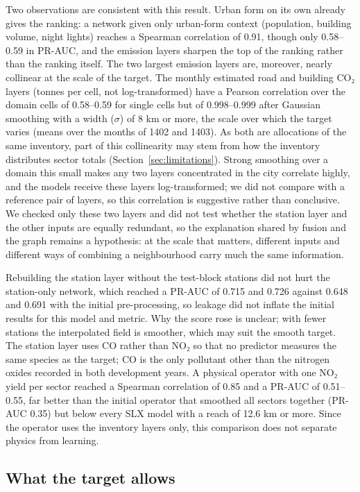 \documentclass[pdflatex,sn-basic]{sn-jnl}
\begin{document}
Two observations are consistent with this result. Urban form on its own already gives the ranking: a network given only urban-form context (population, building volume, night lights) reaches a Spearman correlation of 0.91, though only 0.58--0.59 in PR-AUC, and the emission layers sharpen the top of the ranking rather than the ranking itself. The two largest emission layers are, moreover, nearly collinear at the scale of the target. The monthly estimated road and building CO₂ layers (tonnes per cell, not log-transformed) have a Pearson correlation over the domain cells of 0.58--0.59 for single cells but of 0.998--0.999 after Gaussian smoothing with a width ($\sigma$) of 8 km or more, the scale over which the target varies (means over the months of 1402 and 1403). As both are allocations of the same inventory, part of this collinearity may stem from how the inventory distributes sector totals (Section~\ref{sec:limitations}). Strong smoothing over a domain this small makes any two layers concentrated in the city correlate highly, and the models receive these layers log-transformed; we did not compare with a reference pair of layers, so this correlation is suggestive rather than conclusive. We checked only these two layers and did not test whether the station layer and the other inputs are equally redundant, so the explanation shared by fusion and the graph remains a hypothesis: at the scale that matters, different inputs and different ways of combining a neighbourhood carry much the same information.

Rebuilding the station layer without the test-block stations did not hurt the station-only network, which reached a PR-AUC of 0.715 and 0.726 against 0.648 and 0.691 with the initial pre-processing, so leakage did not inflate the initial results for this model and metric. Why the score rose is unclear; with fewer stations the interpolated field is smoother, which may suit the smooth target. The station layer uses CO rather than NO₂ so that no predictor measures the same species as the target; CO is the only pollutant other than the nitrogen oxides recorded in both development years. A physical operator with one NO₂ yield per sector reached a Spearman correlation of 0.85 and a PR-AUC of 0.51--0.55, far better than the initial operator that smoothed all sectors together (PR-AUC 0.35) but below every SLX model with a reach of 12.6 km or more. Since the operator uses the inventory layers only, this comparison does not separate physics from learning.

\subsection{What the target allows}\label{sec:target-limits}
\end{document}
